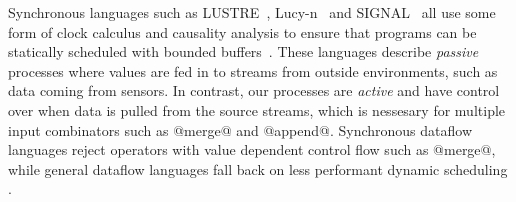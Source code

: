 




Synchronous languages such as LUSTRE~\cite{halbwachs1991synchronous}, Lucy-n~\cite{mandel2010lucy} and SIGNAL~\cite{le2003polychrony} all use some form of clock calculus and causality analysis to ensure that programs can be statically scheduled with bounded buffers~\cite{caspi1996:kahn}. These languages describe \emph{passive} processes where values are fed in to streams from outside environments, such as data coming from sensors. In contrast, our processes are \emph{active} and have control over when data is pulled from the source streams, which is nessesary for multiple input combinators such as @merge@ and  @append@.
Synchronous dataflow languages reject operators with value dependent control flow such as @merge@, while general dataflow languages fall back on less performant dynamic scheduling \cite{bouakaz2013real}.


